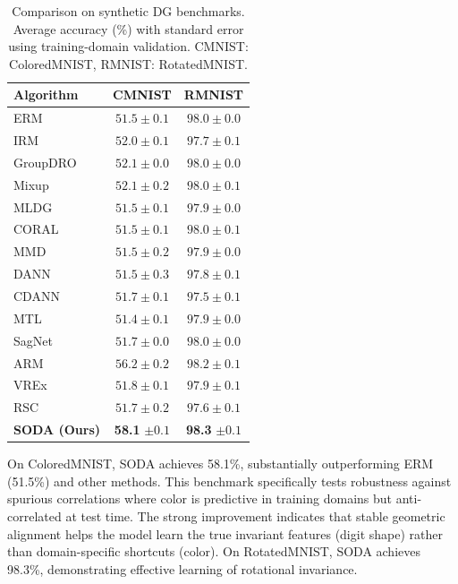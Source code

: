 \documentclass[preprint,12pt]{elsarticle}
\begin{document}
\begin{table}[t]
\caption{Comparison on synthetic DG benchmarks. Average accuracy (\%) with standard error using training-domain validation. CMNIST: ColoredMNIST, RMNIST: RotatedMNIST.}
\label{tab:synthetic_results}
\centering
\small
\renewcommand{\arraystretch}{1.1}
\begin{tabular}{lcc}
\toprule
\textbf{Algorithm} & \textbf{CMNIST} & \textbf{RMNIST} \\
\midrule
ERM \citep{vapnik1999nature} & $51.5 \pm 0.1$ & $98.0 \pm 0.0$ \\
IRM \citep{arjovsky2019invariant} & $52.0 \pm 0.1$ & $97.7 \pm 0.1$ \\
GroupDRO \citep{sagawa2019distributionally} & $52.1 \pm 0.0$ & $98.0 \pm 0.0$ \\
Mixup \citep{yan2020improve} & $52.1 \pm 0.2$ & $98.0 \pm 0.1$ \\
MLDG \citep{li2018learning_meta} & $51.5 \pm 0.1$ & $97.9 \pm 0.0$ \\
CORAL \citep{sun2016deep} & $51.5 \pm 0.1$ & $98.0 \pm 0.1$ \\
MMD \citep{li2018domain_mmd} & $51.5 \pm 0.2$ & $97.9 \pm 0.0$ \\
DANN \citep{ganin2016domain} & $51.5 \pm 0.3$ & $97.8 \pm 0.1$ \\
CDANN \citep{li2018deep_cdann} & $51.7 \pm 0.1$ & $97.5 \pm 0.1$ \\
MTL \citep{blanchard2021domain} & $51.4 \pm 0.1$ & $97.9 \pm 0.0$ \\
SagNet \citep{nam2021reducing} & $51.7 \pm 0.0$ & $98.0 \pm 0.0$ \\
ARM \citep{zhang2021adaptive} & $56.2 \pm 0.2$ & $98.2 \pm 0.1$ \\
VREx \citep{krueger2021out} & $51.8 \pm 0.1$ & $97.9 \pm 0.1$ \\
RSC \citep{huang2020self} & $51.7 \pm 0.2$ & $97.6 \pm 0.1$ \\
\midrule
\textbf{SODA (Ours)} & \textbf{58.1} $\pm 0.1$ & \textbf{98.3} $\pm 0.1$ \\
\bottomrule
\end{tabular}
\end{table}

On ColoredMNIST, SODA achieves 58.1\%, substantially outperforming ERM (51.5\%) and other methods. This benchmark specifically tests robustness against spurious correlations where color is predictive in training domains but anti-correlated at test time. The strong improvement indicates that stable geometric alignment helps the model learn the true invariant features (digit shape) rather than domain-specific shortcuts (color). On RotatedMNIST, SODA achieves 98.3\%, demonstrating effective learning of rotational invariance.
\end{document}
